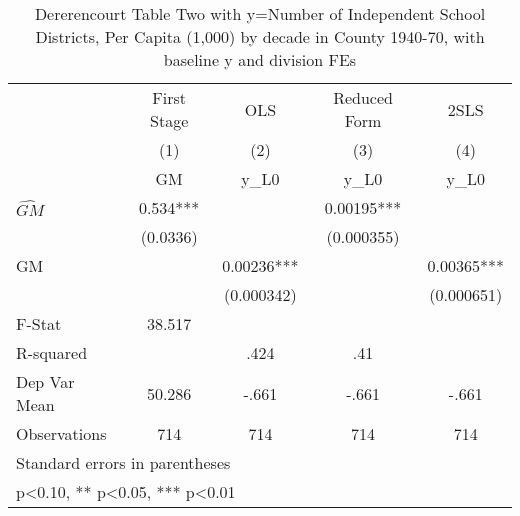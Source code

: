 \begin{table}[htbp]\centering
\def\sym#1{\ifmmode^{#1}\else\(^{#1}\)\fi}
\caption{Dererencourt Table Two with y=Number of Independent School Districts, Per Capita (1,000) by decade in County 1940-70, with baseline y and division FEs}
\begin{tabular}{l*{4}{c}}
\toprule
                    & First Stage   &         OLS   &Reduced Form   &        2SLS   \\
                    &\multicolumn{1}{c}{(1)}&\multicolumn{1}{c}{(2)}&\multicolumn{1}{c}{(3)}&\multicolumn{1}{c}{(4)}\\
                    &\multicolumn{1}{c}{GM}&\multicolumn{1}{c}{y\_L0}&\multicolumn{1}{c}{y\_L0}&\multicolumn{1}{c}{y\_L0}\\
\midrule
$\hat{GM}$          &       0.534***&               &     0.00195***&               \\
                    &    (0.0336)   &               &  (0.000355)   &               \\
\addlinespace
GM                  &               &     0.00236***&               &     0.00365***\\
                    &               &  (0.000342)   &               &  (0.000651)   \\
\midrule
F-Stat              &      38.517   &               &               &               \\
R-squared           &               &        .424   &         .41   &               \\
Dep Var Mean        &      50.286   &       -.661   &       -.661   &       -.661   \\
Observations        &         714   &         714   &         714   &         714   \\
\bottomrule
\multicolumn{5}{l}{\footnotesize Standard errors in parentheses}\\
\multicolumn{5}{l}{\footnotesize * p<0.10, ** p<0.05, *** p<0.01}\\
\end{tabular}
\end{table}
